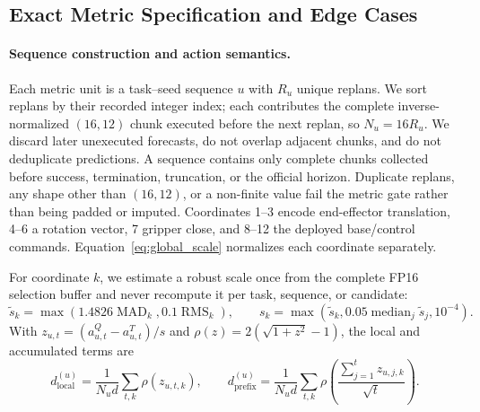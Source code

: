 \subsection{Exact Metric Specification and Edge Cases}
\label{sec:metric_specification}

\paragraph{Sequence construction and action semantics.}
Each metric unit is a task--seed sequence $u$ with $R_u$ unique replans. We sort replans by their recorded integer index; each contributes the complete inverse-normalized $(16,12)$ chunk executed before the next replan, so $N_u=16R_u$. We discard later unexecuted forecasts, do not overlap adjacent chunks, and do not deduplicate predictions. A sequence contains only complete chunks collected before success, termination, truncation, or the official horizon. Duplicate replans, any shape other than $(16,12)$, or a non-finite value fail the metric gate rather than being padded or imputed. Coordinates 1--3 encode end-effector translation, 4--6 a rotation vector, 7 gripper close, and 8--12 the deployed base/control commands. Equation~\ref{eq:global_scale} normalizes each coordinate separately.

For coordinate $k$, we estimate a robust scale once from the complete FP16 selection buffer and never recompute it per task, sequence, or candidate:
\begin{equation}
 \tilde{s}_k=\max\!\left(1.4826\operatorname{MAD}_k,0.1\operatorname{RMS}_k\right),\qquad
 s_k=\max\!\left(\tilde{s}_k,0.05\operatorname{median}_{j}\tilde{s}_j,10^{-4}\right).
 \label{eq:global_scale}
\end{equation}
With $z_{u,t}=(a^Q_{u,t}-a^T_{u,t})/s$ and $\rho(z)=2(\sqrt{1+z^2}-1)$, the local and accumulated terms are
\begin{equation}
 d_{\mathrm{local}}^{(u)}=\frac{1}{N_ud}\sum_{t,k}\rho(z_{u,t,k}),\qquad
 d_{\mathrm{prefix}}^{(u)}=\frac{1}{N_ud}\sum_{t,k}
 \rho\!\left(\frac{\sum_{j=1}^{t}z_{u,j,k}}{\sqrt{t}}\right).
 \label{eq:local_prefix}
\end{equation}

